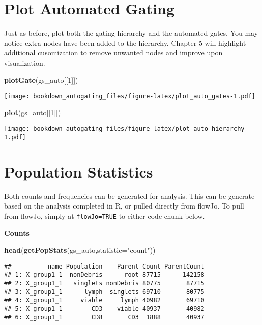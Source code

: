 \documentclass[]{book}
\newenvironment{Shaded}{\begin{snugshade}}{\end{snugshade}}
\newcommand{\DataTypeTok}[1]{\textcolor[rgb]{0.13,0.29,0.53}{#1}}
\newcommand{\DecValTok}[1]{\textcolor[rgb]{0.00,0.00,0.81}{#1}}
\newcommand{\KeywordTok}[1]{\textcolor[rgb]{0.13,0.29,0.53}{\textbf{#1}}}
\newcommand{\NormalTok}[1]{#1}
\newcommand{\StringTok}[1]{\textcolor[rgb]{0.31,0.60,0.02}{#1}}
\begin{document}
\hypertarget{plot-automated-gating}{%
\section{Plot Automated Gating}\label{plot-automated-gating}}

Just as before, plot both the gating hierarchy and the automated gates. You may notice extra nodes have been added to the hierarchy. Chapter 5 will highlight additional cusomization to remove unwanted nodes and improve upon visualization.

\begin{Shaded}
\begin{Highlighting}[]
\KeywordTok{plotGate}\NormalTok{(gs_auto[[}\DecValTok{1}\NormalTok{]])}
\end{Highlighting}
\end{Shaded}

\texttt{[image: bookdown\_autogating\_files/figure-latex/plot\_auto\_gates-1.pdf]}

\begin{Shaded}
\begin{Highlighting}[]
\KeywordTok{plot}\NormalTok{(gs_auto[[}\DecValTok{1}\NormalTok{]])}
\end{Highlighting}
\end{Shaded}

\texttt{[image: bookdown\_autogating\_files/figure-latex/plot\_auto\_hierarchy-1.pdf]}

\hypertarget{population-statistics}{%
\section{Population Statistics}\label{population-statistics}}

Both counts and frequencies can be generated for analysis. This can be generate based on the analysis completed in R, or pulled directly from flowJo. To pull from flowJo, simply at \texttt{flowJo=TRUE} to either code chunk below.

\textbf{Counts}

\begin{Shaded}
\begin{Highlighting}[]
\KeywordTok{head}\NormalTok{(}\KeywordTok{getPopStats}\NormalTok{(gs_auto,}\DataTypeTok{statistic=}\StringTok{"count"}\NormalTok{))}
\end{Highlighting}
\end{Shaded}

\begin{verbatim}
##          name Population    Parent Count ParentCount
## 1: X_group1_1  nonDebris      root 87715      142158
## 2: X_group1_1   singlets nonDebris 80775       87715
## 3: X_group1_1      lymph  singlets 69710       80775
## 4: X_group1_1     viable     lymph 40982       69710
## 5: X_group1_1        CD3    viable 40937       40982
## 6: X_group1_1        CD8       CD3  1888       40937
\end{verbatim}
\end{document}
